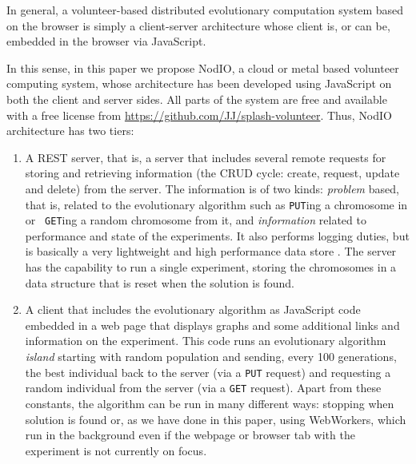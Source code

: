 \documentclass[journal,onecolumn]{IEEEtran}
\begin{document}
In general, a volunteer-based distributed evolutionary computation
system based on the browser is simply a client-server architecture
whose client is, or can be, embedded in the browser via JavaScript. 

In this sense, in this paper we propose {\sf NodIO}, a cloud or metal based 
volunteer computing system, whose architecture
has been developed using JavaScript on both the client and server sides.
All parts of the system are free and available with a free
license from \url{https://github.com/JJ/splash-volunteer}.
Thus, {\sf NodIO} architecture has two tiers:\begin{enumerate}
\item A REST server, that is, a server that includes several remote %
  requests for storing and retrieving information (the CRUD cycle:
  create, request, update and delete) from the server. The information
  is of two kinds: {\em problem} based, that is, related to the
  evolutionary algorithm such as {\tt PUT}ing a chromosome in or {\tt
    GET}ing a random chromosome from it, and {\em information} related
  to performance and state of the experiments. It also performs logging
  duties, but is basically a very lightweight and high performance
  data store \cite{jj:idc:lowcost}. 
  The server has the capability to
  run a single experiment, storing the chromosomes in a data structure
  that is reset when the solution is found. 
\item A client that includes the evolutionary algorithm as 
  JavaScript code embedded in a web page that displays graphs and some
  additional links and information on the experiment. This code runs
  an evolutionary algorithm {\em island} starting with random
  population and sending, every 100 generations, the best individual
  back to the server (via a {\tt PUT} request) and requesting a random
  individual from the server (via a {\tt GET} request). Apart from
  these constants, the algorithm can be run in many different ways:
  stopping when solution is found or, as we have done in this paper,
  using WebWorkers, which run in the background even if the webpage or
  browser tab with the experiment is not currently on focus.  
\end{enumerate}
\end{document}

